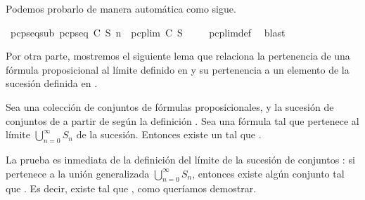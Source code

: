 \begin{isabellebody}
%
\endisatagproof
{\isafoldproof}%
%
\isadelimproof
%
\endisadelimproof
%
\begin{isamarkuptext}%
Podemos probarlo de manera automática como sigue.%
\end{isamarkuptext}\isamarkuptrue%
\isamarkupfalse%
\ pcp{\isacharunderscore}seq{\isacharunderscore}sub{\isacharcolon}\ {\isachardoublequoteopen}pcp{\isacharunderscore}seq\ C\ S\ n\ {\isasymsubseteq}\ pcp{\isacharunderscore}lim\ C\ S{\isachardoublequoteclose}\ \isanewline
%
\isadelimproof
\ \ %
\endisadelimproof
%
\isatagproof
{}\isamarkupfalse%
\ pcp{\isacharunderscore}lim{\isacharunderscore}def\ \isamarkupfalse%
\ blast%
\endisatagproof
{\isafoldproof}%
%
\isadelimproof
%
\endisadelimproof
%
\begin{isamarkuptext}%
Por otra parte, mostremos el siguiente lema que relaciona la pertenencia de una fórmula 
  proposicional al límite definido en  y su pertenencia a un elemento de la sucesión definida
  en . 

  \begin{lema}
    Sea  una colección de conjuntos de fórmulas proposicionales,  y  la sucesión de 
    conjuntos de  a partir de  según la definición . Sea  una fórmula tal que
    pertenece al límite $\bigcup_{n = 0}^{\infty} S_{n}$ de la sucesión. Entonces existe un  
    tal que . 
  \end{lema}

  \begin{demostracion}
    La prueba es inmediata de la definición del límite de la sucesión de conjuntos : si
     pertenece a la unión generalizada $\bigcup_{n = 0}^{\infty} S_{n}$, entonces existe algún
    conjunto  tal que . Es decir, existe  tal que , como queríamos
    demostrar.
  \end{demostracion} 


\end{isamarkuptext}
\end{isabellebody}
